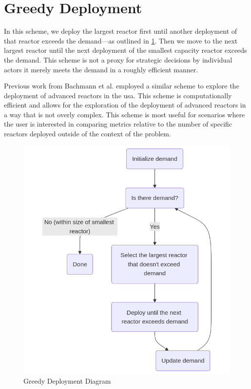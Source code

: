 \section{Greedy Deployment}
\label{sec:greedy_deployment}

In this scheme, we deploy the largest reactor first until another
deployment of that reactor exceeds the demand---as outlined in
\ref{fig:greedy_diagram}. Then we move to the next largest reactor until the
next deployment of the smallest capacity reactor exceeds the
demand. This scheme is not a proxy for strategic decisions by individual
actors it merely meets the demand in a roughly efficient manner.

Previous work from Bachmann et al. \cite{bachmann_enrichment_2021}
employed a similar scheme to explore the deployment of advanced
reactors in the \gls{usa}. This scheme is computationally efficient and allows
for the exploration of the deployment of advanced reactors in a way that is not
overly complex. This scheme is most useful for scenarios where the user is
interested in comparing metrics relative to the number of specific reactors
deployed outside of the context of the problem.

\begin{figure}[H]
    \centering
    \includegraphics[scale=0.3]{images/schemes/greedy_diagram.png}
    \caption{Greedy Deployment Diagram}
    \label{fig:greedy_diagram}
\end{figure}

